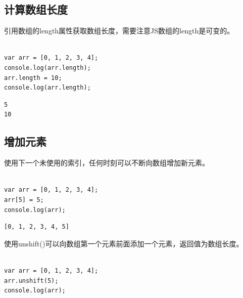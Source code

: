 \subsection{计算数组长度}

引用数组的length属性获取数组长度，需要注意JS数组的length是可变的。\\

\\

\begin{lstlisting}[style=htmlcssjs]
var arr = [0, 1, 2, 3, 4];
console.log(arr.length);
arr.length = 10;
console.log(arr.length);
\end{lstlisting}

\begin{tcolorbox}
	\begin{verbatim}
5
10
	\end{verbatim}
\end{tcolorbox}

\vspace{0.5cm}

\subsection{增加元素}

使用下一个未使用的索引，任何时刻可以不断向数组增加新元素。\\

\\

\begin{lstlisting}[style=htmlcssjs]
var arr = [0, 1, 2, 3, 4];
arr[5] = 5;
console.log(arr);
\end{lstlisting}

\begin{tcolorbox}
	\begin{verbatim}
[0, 1, 2, 3, 4, 5]
	\end{verbatim}
\end{tcolorbox}

使用unshift()可以向数组第一个元素前面添加一个元素，返回值为数组长度。\\

\\

\begin{lstlisting}[style=htmlcssjs]
var arr = [0, 1, 2, 3, 4];
arr.unshift(5);
console.log(arr);
\end{lstlisting}

